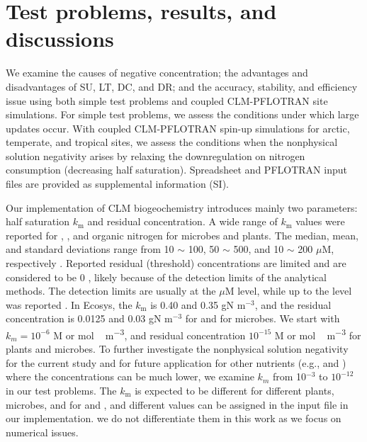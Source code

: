 \documentclass[gmd, manuscript]{copernicus}
\begin{document}
%

\section{Test problems, results, and discussions}
We examine the causes of negative concentration; the advantages and
disadvantages of SU, LT, DC, and DR; and the accuracy, stability, and
efficiency issue using both simple test problems and coupled CLM-PFLOTRAN site
simulations. For simple test problems, we assess the conditions under which large
updates occur. With coupled CLM-PFLOTRAN spin-up simulations for arctic,
temperate, and tropical sites, we assess the conditions when the nonphysical solution negativity 
arises by relaxing the downregulation on nitrogen consumption (decreasing half
saturation). Spreadsheet and PFLOTRAN input files 
are provided as supplemental
information (SI).

Our implementation of CLM biogeochemistry introduces mainly two parameters:
half saturation $k_\text{m}$ and residual concentration. A wide range of
$k_\text{m}$ values were reported for , , and organic
nitrogen for microbes and plants. The median, mean, and standard deviations
range from 10 $\sim$ 100, 50 $\sim$ 500, and 10 $\sim$ 200 $\mu$M, respectively
\citep{Kuzyakov2013}. Reported residual (threshold) concentrations are limited
and are considered to be 0 \cite[e.g.,][]{Hogh1997}, likely because of the
detection limits of the analytical methods. The detection limits are usually at the
$\mu$M level, while up to the  level was reported \citep{Nollet2013}. In Ecosys,
the $k_\text{m}$ is 0.40 and 0.35 gN m$^{-3}$, and the residual concentration
is 0.0125 and 0.03 gN m$^{-3}$ \citep{Grant2013} for  and
 for microbes.  %
We start with $k_m=10^{-6}$ \unit{M} or \unit{mol\,m^{-3}},
and residual concentration $10^{-15}$ \unit{M} or \unit{mol\, m^{-3}} for
plants and microbes. To further investigate the nonphysical solution negativity for the
current study and for future application for other nutrients (e.g., 
and ) where the concentrations can be much lower, we examine $k_m$
from 10$^{-3}$ to $10^{-12}$ in our test problems. The $k_\text{m}$ is expected
to be different for different plants, microbes, and for  and
, and different values can be assigned in the input file in our
implementation. we do not differentiate them in this work as we focus on
numerical issues. 
\end{document}
